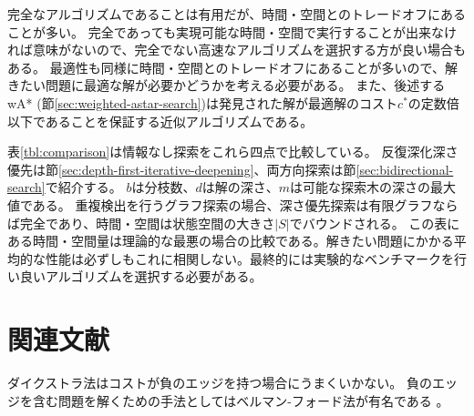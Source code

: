 完全なアルゴリズムであることは有用だが、時間・空間とのトレードオフにあることが多い。
完全であっても実現可能な時間・空間で実行することが出来なければ意味がないので、完全でない高速なアルゴリズムを選択する方が良い場合もある。
最適性も同様に時間・空間とのトレードオフにあることが多いので、解きたい問題に最適な解が必要かどうかを考える必要がある。
また、後述するwA* (節\ref{sec:weighted-astar-search})は発見された解が最適解のコスト$c^*$の定数倍以下であることを保証する近似アルゴリズムである。


表\ref{tbl:comparison}は情報なし探索をこれら四点で比較している。
反復深化深さ優先は節\ref{sec:depth-first-iterative-deepening}、両方向探索は節\ref{sec:bidirectional-search}で紹介する。
$b$は分枝数、$d$は解の深さ、$m$は可能な探索木の深さの最大値である。
重複検出を行うグラフ探索の場合、深さ優先探索は有限グラフならば完全であり、時間・空間は状態空間の大きさ$|S|$でバウンドされる。
この表にある時間・空間量は理論的な最悪の場合の比較である。解きたい問題にかかる平均的な性能は必ずしもこれに相関しない。最終的には実験的なベンチマークを行い良いアルゴリズムを選択する必要がある。

\begin{table}[tbh]
\centering
\caption{木探索アルゴリズムの比較 (\cite{russelln03}のFigure 3.21より)}
\label{tbl:comparison}
\end{table}


\section{関連文献}

ダイクストラ法はコストが負のエッジを持つ場合にうまくいかない。
負のエッジを含む問題を解くための手法としてはベルマン-フォード法が有名である \cite{bellman1958routing,ford1956network}。


